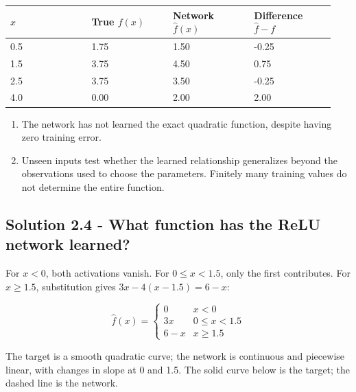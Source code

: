 \documentclass{course_sheet}
\providecommand{\tightlist}{%
  \setlength{\itemsep}{0pt}\setlength{\parskip}{0pt}}
\begin{document}
\begin{center}

\begingroup
\setlength{\tabcolsep}{3pt}
\begin{tabular}{@{}p{0.234\linewidth}p{0.234\linewidth}p{0.234\linewidth}p{0.234\linewidth}@{}}
\toprule
$x$ & True $f(x)$ & Network $\hat f(x)$ & Difference $\hat f-f$ \\
\midrule
0.5 & 1.75 & 1.50 & -0.25 \\
1.5 & 3.75 & 4.50 & 0.75 \\
2.5 & 3.75 & 3.50 & -0.25 \\
4.0 & 0.00 & 2.00 & 2.00 \\
\bottomrule
\end{tabular}
\endgroup

\end{center}

\begin{enumerate}
\def\labelenumi{\arabic{enumi}.}
\tightlist
\item
  The network has not learned the exact quadratic function, despite
  having zero training error.
\item
  Unseen inputs test whether the learned relationship generalizes beyond
  the observations used to choose the parameters. Finitely many training
  values do not determine the entire function.
\end{enumerate}

\subsection{Solution 2.4 - What function has the ReLU network learned?}

For $x<0$, both activations vanish. For $0\leq x<1.5$, only the first
contributes. For $x\geq1.5$, substitution gives $3x-4(x-1.5)=6-x$:

\begin{equation*}
\hat f(x)=\begin{cases}
0 & x<0\\
3x & 0\leq x<1.5\\
6-x & x\geq1.5
\end{cases}
\end{equation*}

The target is a smooth quadratic curve; the network is continuous and
piecewise linear, with changes in slope at 0 and 1.5. The solid curve
below is the target; the dashed line is the network.
\end{document}
